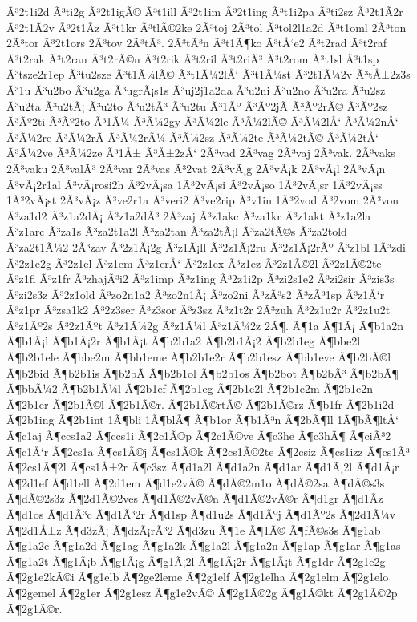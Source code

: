 {Ã³2t1i2d
Ã³ti2g
Ã³2t1igÃ©
Ã³t1ill
Ã³2t1im
Ã³2t1ing
Ã³t1i2pa
Ã³ti2sz
Ã³2t1Ã­2r
Ã³2t1Ã­2v
Ã³2t1Ã­z
Ã³t1kr
Ã³tlÃ©2ke
2Ã³toj
2Ã³tol
Ã³tol2l1a2d
Ã³t1oml
2Ã³ton
2Ã³tor
Ã³2t1ors
2Ã³tov
2Ã³tÃ³.
2Ã³tÃ³n
Ã³t1Ã¶ko
Ã³tÅ‘e2
Ã³t2rad
Ã³t2raf
Ã³t2rak
Ã³t2ran
Ã³t2rÃ©n
Ã³t2rik
Ã³t2ril
Ã³t2riÃ³
Ã³t2rom
Ã³t1sl
Ã³t1sp
Ã³tsze2r1ep
Ã³tu2sze
Ã³t1Ã¼lÃ©
Ã³t1Ã¼2lÅ‘
Ã³t1Ã¼st
Ã³2t1Ã¼2v
Ã³tÅ±2z3s
Ã³1u
Ã³u2bo
Ã³u2ga
Ã³ugrÃ¡s1s
Ã³uj2j1a2da
Ã³u2ni
Ã³u2no
Ã³u2ra
Ã³u2sz
Ã³u2ta
Ã³u2tÃ¡
Ã³u2to
Ã³u2tÃ³
Ã³u2tu
Ã³1Ãº
Ã³Ãº2jÃ­
Ã³Ãº2rÃ©
Ã³Ãº2sz
Ã³Ãº2ti
Ã³Ãº2to
Ã³1Ã¼
Ã³Ã¼2gy
Ã³Ã¼2le
Ã³Ã¼2lÃ©
Ã³Ã¼2lÅ‘
Ã³Ã¼2nÅ‘
Ã³Ã¼2re
Ã³Ã¼2rÃ­
Ã³Ã¼2rÃ¼
Ã³Ã¼2sz
Ã³Ã¼2te
Ã³Ã¼2tÃ©
Ã³Ã¼2tÅ‘
Ã³Ã¼2ve
Ã³Ã¼2ze
Ã³1Å±
Ã³Å±2zÅ‘
2Ã³vad
2Ã³vag
2Ã³vaj
2Ã³vak.
2Ã³vaks
2Ã³vaku
2Ã³valÃ³
2Ã³var
2Ã³vas
Ã³2vat
2Ã³vÃ¡g
2Ã³vÃ¡k
2Ã³vÃ¡l
2Ã³vÃ¡n
Ã³vÃ¡2r1al
Ã³vÃ¡rosi2h
Ã³2vÃ¡sa
1Ã³2vÃ¡si
Ã³2vÃ¡so
1Ã³2vÃ¡sr
1Ã³2vÃ¡ss
1Ã³2vÃ¡st
2Ã³vÃ¡z
Ã³ve2r1a
Ã³veri2
Ã³ve2rip
Ã³v1in
1Ã³2vod
Ã³2vom
2Ã³von
Ã³za1d2
Ã³z1a2dÃ¡
Ã³z1a2dÃ³
2Ã³zaj
Ã³z1akc
Ã³za1kr
Ã³z1akt
Ã³z1a2la
Ã³z1arc
Ã³za1s
Ã³za2t1a2l
Ã³za2tan
Ã³za2tÃ¡l
Ã³za2tÃ©s
Ã³za2told
Ã³za2t1Ã¼2
2Ã³zav
Ã³2z1Ã¡2g
Ã³z1Ã¡ll
Ã³2z1Ã¡2ru
Ã³2z1Ã¡2rÃº
Ã³z1bl
1Ã³zdi
Ã³2z1e2g
Ã³2z1el
Ã³z1em
Ã³z1erÅ‘
Ã³2z1ex
Ã³z1ez
Ã³2z1Ã©2l
Ã³2z1Ã©2te
Ã³z1fl
Ã³z1fr
Ã³zhajÃ³i2
Ã³z1imp
Ã³z1ing
Ã³2z1i2p
Ã³zi2s1e2
Ã³zi2sir
Ã³zis3s
Ã³zi2s3z
Ã³2z1old
Ã³zo2n1a2
Ã³zo2n1Ã¡
Ã³zo2ni
Ã³zÃ³s2
Ã³zÃ³1sp
Ã³z1Å‘r
Ã³z1pr
Ã³zsa1k2
Ã³2z3ser
Ã³z3sor
Ã³z3sz
Ã³z1t2r
2Ã³zuh
Ã³2z1u2r
Ã³2z1u2t
Ã³z1Ãº2s
Ã³2z1Ãºt
Ã³z1Ã¼2g
Ã³z1Ã¼l
Ã³z1Ã¼2z
2Ã¶.
Ã¶1a
Ã¶1Ã¡
Ã¶b1a2n
Ã¶b1Ã¡l
Ã¶b1Ã¡2r
Ã¶b1Ã¡t
Ã¶b2b1a2
Ã¶b2b1Ã¡2
Ã¶b2b1eg
Ã¶bbe2l
Ã¶b2b1ele
Ã¶bbe2m
Ã¶bb1eme
Ã¶b2b1e2r
Ã¶b2b1esz
Ã¶bb1eve
Ã¶b2bÃ©l
Ã¶b2bid
Ã¶b2b1is
Ã¶b2bÃ­
Ã¶b2b1ol
Ã¶b2b1os
Ã¶b2bot
Ã¶b2bÃ³
Ã¶b2bÃ¶
Ã¶bbÃ¼2
Ã¶b2b1Ã¼l
Ã¶2b1ef
Ã¶2b1eg
Ã¶2b1e2l
Ã¶2b1e2m
Ã¶2b1e2n
Ã¶2b1er
Ã¶2b1Ã©l
Ã¶2b1Ã©r.
Ã¶2b1Ã©rtÃ©
Ã¶2b1Ã©rz
Ã¶b1fr
Ã¶2b1i2d
Ã¶2b1ing
Ã¶2b1int
1Ã¶bli
1Ã¶blÃ¶
Ã¶b1or
Ã¶b1Ã³n
Ã¶2bÃ¶ll
1Ã¶bÃ¶ltÅ‘
Ã¶c1aj
Ã¶ccs1a2
Ã¶ccs1i
Ã¶2c1Ã©p
Ã¶2c1Ã©ve
Ã¶c3he
Ã¶c3hÃ¶
Ã¶ciÃ³2
Ã¶c1Å‘r
Ã¶2cs1a
Ã¶cs1Ã©j
Ã¶cs1Ã©k
Ã¶2cs1Ã©2te
Ã¶2csiz
Ã¶cs1izz
Ã¶cs1Ã³
Ã¶2cs1Ã¶2l
Ã¶cs1Å±2r
Ã¶c3sz
Ã¶d1a2l
Ã¶d1a2n
Ã¶d1ar
Ã¶d1Ã¡2l
Ã¶d1Ã¡r
Ã¶2d1ef
Ã¶d1ell
Ã¶2d1em
Ã¶d1e2vÃ©
Ã¶dÃ©2m1o
Ã¶dÃ©2sa
Ã¶dÃ©s3s
Ã¶dÃ©2s3z
Ã¶2d1Ã©2ves
Ã¶d1Ã©2vÃ©n
Ã¶d1Ã©2vÃ©r
Ã¶d1gr
Ã¶d1Ã­z
Ã¶d1os
Ã¶d1Ã³c
Ã¶d1Ã³2r
Ã¶d1sp
Ã¶d1u2s
Ã¶d1Ãºj
Ã¶d1Ãº2s
Ã¶2d1Ã¼v
Ã¶2d1Å±z
Ã¶d3zÃ¡
Ã¶dzÃ¡rÃ³2
Ã¶d3zu
Ã¶1e
Ã¶1Ã©
Ã¶fÃ©s3s
Ã¶g1ab
Ã¶g1a2c
Ã¶g1a2d
Ã¶g1ag
Ã¶g1a2k
Ã¶g1a2l
Ã¶g1a2n
Ã¶g1ap
Ã¶g1ar
Ã¶g1as
Ã¶g1a2t
Ã¶g1Ã¡b
Ã¶g1Ã¡g
Ã¶g1Ã¡2l
Ã¶g1Ã¡2r
Ã¶g1Ã¡t
Ã¶g1dr
Ã¶2g1e2g
Ã¶2g1e2kÃ©i
Ã¶g1elb
Ã¶2ge2leme
Ã¶2g1elf
Ã¶2g1elha
Ã¶2g1elm
Ã¶2g1elo
Ã¶2gemel
Ã¶2g1er
Ã¶2g1esz
Ã¶g1e2vÃ©
Ã¶2g1Ã©2g
Ã¶g1Ã©kt
Ã¶2g1Ã©2p
Ã¶2g1Ã©r.
}
